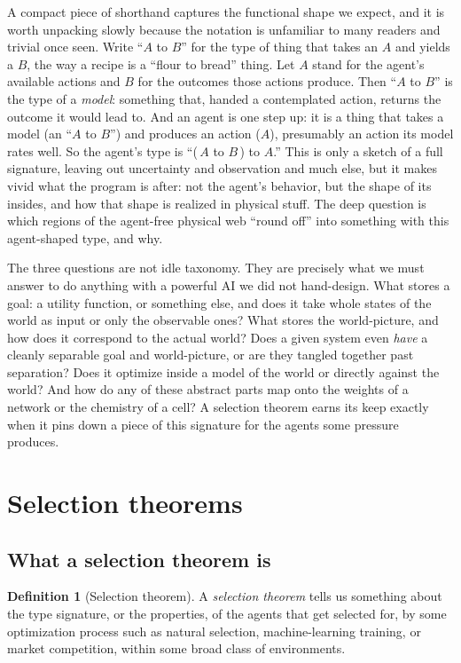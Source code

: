 \documentclass[10pt]{article}
\theoremstyle{definition}
\newtheorem{definition}[theorem]{Definition}
\theoremstyle{remark}
\begin{document}
A compact piece of shorthand captures the functional shape we expect, and it is worth unpacking slowly because the notation is unfamiliar to many readers and trivial once seen. Write ``$A$ to $B$'' for the type of thing that takes an $A$ and yields a $B$, the way a recipe is a ``flour to bread'' thing. Let $A$ stand for the agent's available actions and $B$ for the outcomes those actions produce. Then ``$A$ to $B$'' is the type of a \emph{model}: something that, handed a contemplated action, returns the outcome it would lead to. And an agent is one step up: it is a thing that takes a model (an ``$A$ to $B$'') and produces an action ($A$), presumably an action its model rates well. So the agent's type is ``(\,$A$ to $B$\,) to $A$.'' This is only a sketch of a full signature, leaving out uncertainty and observation and much else, but it makes vivid what the program is after: not the agent's behavior, but the shape of its insides, and how that shape is realized in physical stuff. The deep question is which regions of the agent-free physical web ``round off'' into something with this agent-shaped type, and why.

The three questions are not idle taxonomy. They are precisely what we must answer to do anything with a powerful AI we did not hand-design. What stores a goal: a utility function, or something else, and does it take whole states of the world as input or only the observable ones? What stores the world-picture, and how does it correspond to the actual world? Does a given system even \emph{have} a cleanly separable goal and world-picture, or are they tangled together past separation? Does it optimize inside a model of the world or directly against the world? And how do any of these abstract parts map onto the weights of a network or the chemistry of a cell? A selection theorem earns its keep exactly when it pins down a piece of this signature for the agents some pressure produces.

\section{Selection theorems}
\label{sec:selthm}

\subsection{What a selection theorem is}

\begin{definition}[Selection theorem]
\label{def:selthm}
A \emph{selection theorem} tells us something about the type signature, or the properties, of the agents that get selected for, by some optimization process such as natural selection, machine-learning training, or market competition, within some broad class of environments.
\end{definition}
\end{document}
